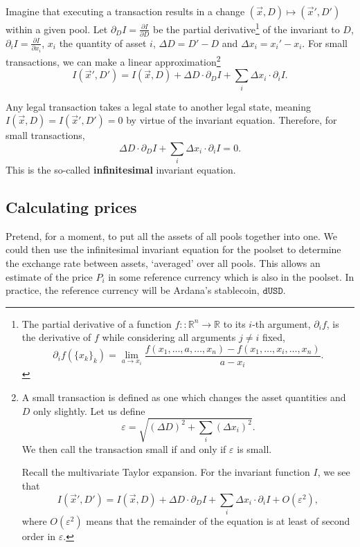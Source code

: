 \documentclass[12pt]{article}
\begin{document}
Imagine that executing a transaction results in a change $(\vec{x}, D) \mapsto
(\vec{x}', D')$ within a given pool.
Let $\partial_D I = \frac{\partial I}{\partial D}$ be the partial
derivative\footnote{
  The partial derivative of a function $f :: \mathbb{R}^n \rightarrow
  \mathbb{R}$ to its $i$-th argument, $\partial_i f$, is the derivative of $f$
  while considering all arguments $j \neq i$ fixed,
  $$ \partial_i f(\{x_k\}_k) = \lim_{a \rightarrow x_i} \frac{f(x_1, \ldots, a,
  \ldots, x_n) - f(x_1, \ldots, x_i, \ldots, x_n)}{a - x_i}. $$
}
\cite{partial-derivative} of the invariant to $D$,
$\partial_i I = \frac{\partial I}{\partial x_i}$, $x_i$ the quantity of asset
$i$, $\Delta D = D' - D$ and $\Delta x_i = x_i' - x_i$.
For small transactions, we can make a linear approximation\footnote{
  A small transaction is defined as one which changes the asset quantities and
  $D$ only slightly.
  Let us define $$ \varepsilon = \sqrt{(\Delta D)^2 + \sum_i (\Delta x_i)^2}. $$
  We then call the transaction small if and only if $\varepsilon$ is small.

  Recall the multivariate Taylor expansion\cite{multivariate-taylor}.
  For the invariant function $I$, we see that
  $$ I(\vec{x}', D') = I(\vec{x}, D) + \Delta D \cdot \partial_D I + \sum_i \Delta
  x_i \cdot \partial_i I + O(\varepsilon^2), $$
  where $O(\varepsilon^2)$ means that the remainder of the equation is at least of
  second order in $\varepsilon$.
}
\cite{linear-approximation}
$$ I(\vec{x}', D') = I(\vec{x}, D) + \Delta D \cdot \partial_D I + \sum_i \Delta
x_i \cdot \partial_i I. $$

Any legal transaction takes a legal state to another legal state, meaning
$I(\vec{x}, D) = I(\vec{x}', D') = 0$ by virtue of the invariant equation.
Therefore, for small transactions,
$$ \Delta D \cdot \partial_D I + \sum_i \Delta x_i \cdot \partial_i I = 0. $$
This is the so-called \textbf{infinitesimal} invariant equation.

\subsection{Calculating prices}

Pretend, for a moment, to put all the assets of all pools together into one.
We could then use the infinitesimal invariant equation for the poolset to
determine the exchange rate between assets, `averaged' over all pools.
This allows an estimate of the price $P_i$ in some reference currency which is
also in the poolset.
In practice, the reference currency will be Ardana's stablecoin,
$\texttt{dUSD}$.
\end{document}
